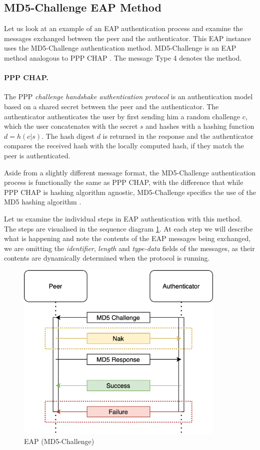 \subsection{MD5-Challenge EAP Method}
Let us look at an example of an EAP authentication process and examine the messages exchanged between the peer and the authenticator. This EAP instance uses the MD5-Challenge authentication method.
MD5-Challenge is an EAP method analogous to PPP CHAP \cite{simpson1996ppp}. The message Type 4 denotes the method.

\paragraph{PPP CHAP.}
The PPP \textit{challenge handshake authentication protocol} is an authentication model based on a shared secret between the peer and the authenticator.
The authenticator authenticates the user by first sending him a random challenge $c$, which the user concatenates with the secret $s$ and hashes with a hashing function $d = h(c | s)$.
The hash digest $d$ is returned in the response and the authenticator compares the received hash with the locally computed hash, if they match the peer is authenticated.

Aside from a slightly different message format, the MD5-Challenge authentication process is functionally the same as PPP CHAP, with the difference that while PPP CHAP is hashing algorithm agnostic, MD5-Challenge specifics the use of the MD5 hashing algorithm \cite{rivest1992md5}.

\bigskip
\noindent
Let us examine the individual steps in EAP authentication with this method. 
The steps are visualised in the sequence diagram \ref{fig:eap-md5}.
At each step we will describe what is happening and note the contents of the EAP messages being exchanged, we are omitting the \textit{identifier}, \textit{length} and \textit{type-data} fields of the messages, as their contents are dynamically determined when the protocol is running.

\begin{figure}[h]
	\centering
	\includegraphics[width=10cm]{images/eap-md5-2}
	\caption{EAP (MD5-Challenge)}
	\label{fig:eap-md5}
\end{figure}

